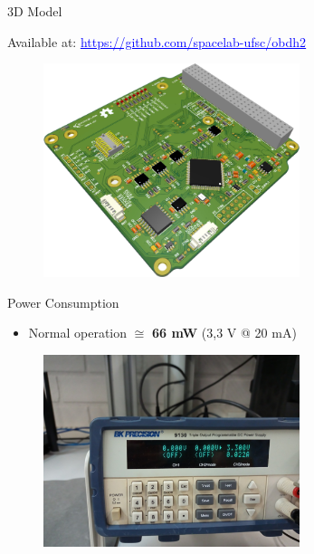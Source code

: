 \begin{frame}{3D Model}

    Available at: \href{https://github.com/spacelab-ufsc/obdh2/tree/master/hardware/outputs/board_3dmodels}{\textcolor{blue}{\underline{https://github.com/spacelab-ufsc/obdh2}}}

    \begin{figure}[!ht]
        \begin{center}
            \includegraphics[width=7.5cm]{figures/obdh2-pcb-3d.png}
        \end{center}
    \end{figure}

\end{frame}


\begin{frame}{Power Consumption}

    \begin{itemize}
        \item Normal operation $\cong$ \textbf{66 mW} (3,3 V @ 20 mA) 
    \end{itemize}

    \begin{figure}[!ht]
        \begin{center}
            \includegraphics[width=7.5cm]{figures/obdh2-consumption.jpg}
        \end{center}
    \end{figure}

\end{frame}

